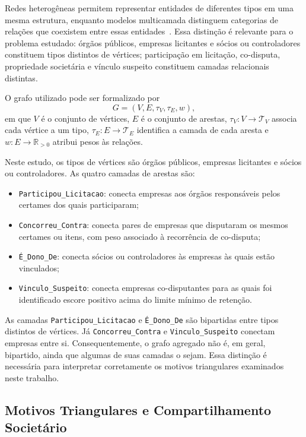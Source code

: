 Redes heterogêneas permitem representar entidades de diferentes tipos em uma mesma estrutura, enquanto modelos multicamada distinguem categorias de relações que coexistem entre essas entidades~\cite{kivela2014multilayer,newman2018networks}. Essa distinção é relevante para o problema estudado: órgãos públicos, empresas licitantes e sócios ou controladores constituem tipos distintos de vértices; participação em licitação, co-disputa, propriedade societária e vínculo suspeito constituem camadas relacionais distintas.

O grafo utilizado pode ser formalizado por
\begin{equation}
  G=(V,E,\tau_V,\tau_E,w),
  \label{eq:grafo_multicamada}
\end{equation}
em que $V$ é o conjunto de vértices, $E$ é o conjunto de arestas, $\tau_V:V\rightarrow\mathcal{T}_V$ associa cada vértice a um tipo, $\tau_E:E\rightarrow\mathcal{T}_E$ identifica a camada de cada aresta e $w:E\rightarrow\mathbb{R}_{>0}$ atribui pesos às relações.

Neste estudo, os tipos de vértices são órgãos públicos, empresas licitantes e sócios ou controladores. As quatro camadas de arestas são:
\begin{itemize}
  \item \texttt{Participou\_Licitacao}: conecta empresas aos órgãos responsáveis pelos certames dos quais participaram;
  \item \texttt{Concorreu\_Contra}: conecta pares de empresas que disputaram os mesmos certames ou itens, com peso associado à recorrência de co-disputa;
  \item \texttt{É\_Dono\_De}: conecta sócios ou controladores às empresas às quais estão vinculados;
  \item \texttt{Vinculo\_Suspeito}: conecta empresas co-disputantes para as quais foi identificado escore positivo acima do limite mínimo de retenção.
\end{itemize}

As camadas \texttt{Participou\_Licitacao} e \texttt{É\_Dono\_De} são bipartidas entre tipos distintos de vértices. Já \texttt{Concorreu\_Contra} e \texttt{Vinculo\_Suspeito} conectam empresas entre si. Consequentemente, o grafo agregado não é, em geral, bipartido, ainda que algumas de suas camadas o sejam. Essa distinção é necessária para interpretar corretamente os motivos triangulares examinados neste trabalho.

\subsection{Motivos Triangulares e Compartilhamento Societário}

